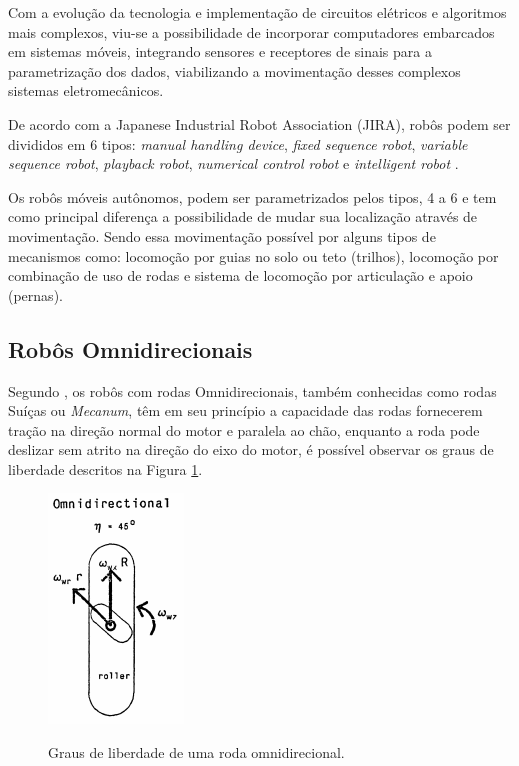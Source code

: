 \documentclass[deposito, acronym, symbols]{fei}
\begin{document}
Com a evolução da tecnologia e implementação de circuitos elétricos e algoritmos mais complexos, viu-se a possibilidade de incorporar computadores embarcados em sistemas móveis, integrando sensores e receptores de sinais para a parametrização dos dados, viabilizando a movimentação desses complexos sistemas eletromecânicos.

De acordo com a Japanese Industrial Robot Association (JIRA), robôs podem ser divididos em 6 tipos: \textit{manual handling device}, \textit{fixed sequence robot}, \textit{variable sequence robot}, \textit{playback robot}, \textit{numerical control robot} e \textit{intelligent robot} \cite{nehmzow2012mobile}.

Os robôs móveis autônomos, podem ser parametrizados pelos tipos, 4 a 6 e tem como principal diferença a possibilidade de mudar sua localização através de movimentação. Sendo essa movimentação possível por alguns tipos de mecanismos como: locomoção por guias no solo ou teto (trilhos), locomoção por combinação de uso de rodas e sistema de locomoção por articulação e apoio (pernas).

\subsection{Robôs Omnidirecionais}

Segundo \textcite{kinematic}, os robôs com rodas Omnidirecionais, também conhecidas como rodas Suíças ou \textit{Mecanum}, têm em seu princípio a capacidade das rodas fornecerem tração na direção normal do motor e paralela ao chão, enquanto a roda pode deslizar sem atrito na direção do eixo do motor, é possível observar os graus de liberdade descritos na Figura \ref{fig:grausdeliberdade}. 

\begin{figure}[!htb]
    \centering
    \caption{Graus de liberdade de uma roda omnidirecional.}
    \includegraphics[width=0.3\linewidth]{Graus de liberdade de rodas omnidirecionais.PNG}
    \label{fig:grausdeliberdade}
\end{figure}
\end{document}

